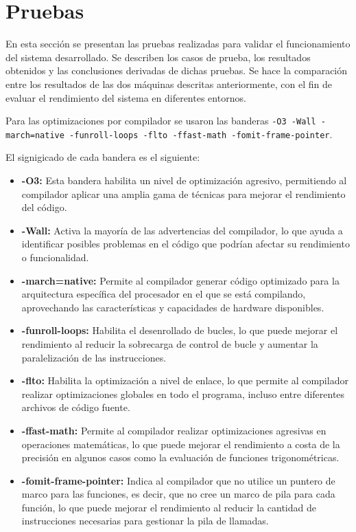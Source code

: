 

\section{Pruebas}
\label{sec:Pruebas}

En esta sección se presentan las pruebas realizadas para validar el funcionamiento del sistema desarrollado. Se describen los casos de prueba, los resultados obtenidos y las conclusiones derivadas de dichas pruebas. Se hace la comparación entre los resultados de las dos máquinas descritas anteriormente, con el fin de evaluar el rendimiento del sistema en diferentes entornos.

Para las optimizaciones por compilador se usaron las banderas \texttt{-O3 -Wall -march=native -funroll-loops -flto -ffast-math -fomit-frame-pointer}.

El signigicado de cada bandera es el siguiente:
\begin{itemize}
   \item \textbf{-O3:} Esta bandera habilita un nivel de optimización agresivo, permitiendo al compilador aplicar una amplia gama de técnicas para mejorar el rendimiento del código.
   \item \textbf{-Wall:} Activa la mayoría de las advertencias del compilador, lo que ayuda a identificar posibles problemas en el código que podrían afectar su rendimiento o funcionalidad.
   \item \textbf{-march=native:} Permite al compilador generar código optimizado para la arquitectura específica del procesador en el que se está compilando, aprovechando las características y capacidades de hardware disponibles.
   \item \textbf{-funroll-loops:} Habilita el desenrollado de bucles, lo que puede mejorar el rendimiento al reducir la sobrecarga de control de bucle y aumentar la paralelización de las instrucciones.
   \item \textbf{-flto:} Habilita la optimización a nivel de enlace, lo que permite al compilador realizar optimizaciones globales en todo el programa, incluso entre diferentes archivos de código fuente.
   \item \textbf{-ffast-math:} Permite al compilador realizar optimizaciones agresivas en operaciones matemáticas, lo que puede mejorar el rendimiento a costa de la precisión en algunos casos como la evaluación de funciones trigonométricas.
   \item \textbf{-fomit-frame-pointer:} Indica al compilador que no utilice un puntero de marco para las funciones, es decir, que no cree un marco de pila para cada función, lo que puede mejorar el rendimiento al reducir la cantidad de instrucciones necesarias para gestionar la pila de llamadas.
\end{itemize}


